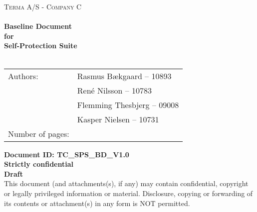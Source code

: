 \documentclass[Main]{subfiles}
\begin{document}
\begin{center}

\textsc{\Large Terma A/S - Company C}\\[0.5cm]


\HRule \\[0.4cm]

{ \huge \bfseries Baseline Document}\\[0.4cm]
{ \huge \bfseries for}\\[0.4cm] 
{ \huge \bfseries Self-Protection Suite}\\[0.4cm]

\HRule \\[1.5cm]

\begin{tabular}{p{}|p{}}
\hline 
Authors: & Rasmus Bækgaard -- 10893\\ &René Nilsson -- 10783\\ &Flemming Thesbjerg -- 09008\\ &Kasper Nielsen -- 10731\\ 
\hline 
Number of pages: & \pageref{LastPage} \\
\hline 
\end{tabular} 

\textbf{\Large Document ID: TC\_SPS\_BD\_V1.0}\\
\textbf{\Large Strictly confidential}\\
\textbf{\Large Draft}\\
[0.5 cm]
This document (and attachments(s), if any) may contain confidential, copyright or legally privileged information or material.
Disclosure, copying or forwarding of its contents or attachment(s) in any form is NOT permitted.
\end{center}
\end{document}

